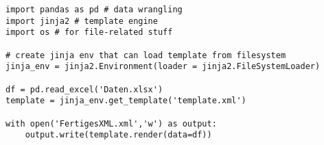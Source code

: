 \documentclass[12pt,ngerman]{scrartcl}
\begin{document}
\blindtext 

\begin{lstlisting}
import pandas as pd # data wrangling
import jinja2 # template engine
import os # for file-related stuff
 
# create jinja env that can load template from filesystem
jinja_env = jinja2.Environment(loader = jinja2.FileSystemLoader)
 
df = pd.read_excel('Daten.xlsx')
template = jinja_env.get_template('template.xml')
 
with open('FertigesXML.xml','w') as output:
    output.write(template.render(data=df))
\end{lstlisting}


\blindtext 


\end{document}
